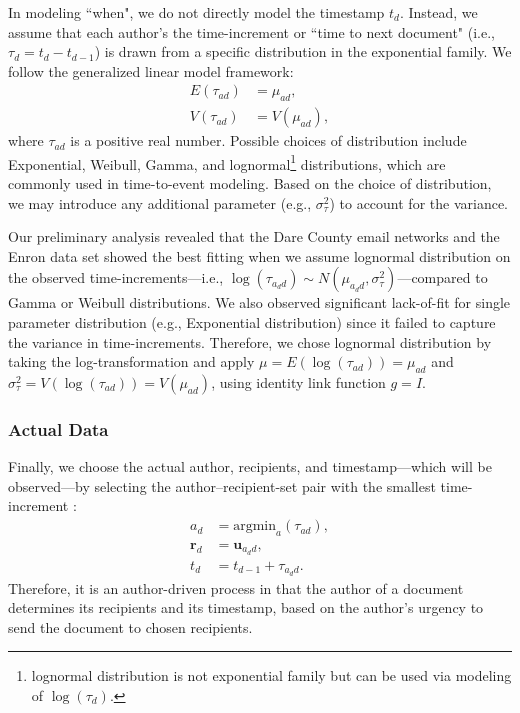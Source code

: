 \documentclass{article}
\begin{document}
In modeling ``when", we do not directly model the timestamp $t_d$. Instead, we assume that each author's the time-increment or ``time to next document" (i.e., $\tau_{d} = t_d-t_{d-1}$) is drawn from a specific distribution in the exponential family.  We follow the generalized linear model framework:
\begin{equation}
\begin{aligned}
E(\tau_{ad}) &= \mu_{ad},\\
V(\tau_{ad}) &= V(\mu_{ad}),
\end{aligned}
\end{equation}
where $\tau_{ad}$ is a positive real number. Possible choices of distribution include Exponential, Weibull, Gamma, and lognormal\footnote{lognormal distribution is not exponential family but can be used via modeling of $\log(\tau_d)$.} distributions, which are commonly used in time-to-event modeling. Based on the choice of distribution, we may introduce any additional parameter (e.g., $\sigma_\tau^2$) to account for the variance.

Our preliminary analysis revealed that the Dare County email networks and the Enron data set showed the best fitting when we assume lognormal distribution on the observed time-increments---i.e., $\log(\tau_{a_dd}) \sim N(\mu_{a_d d}, \sigma^2_\tau)$---compared to Gamma or Weibull distributions. We also observed significant lack-of-fit for single parameter distribution (e.g., Exponential distribution) since it failed to capture the variance in time-increments. Therefore, we chose lognormal distribution by taking the log-transformation and apply $\mu = E(\log(\tau_{ad})) = \mu_{ad}$ and $ \sigma_\tau^2=V(\log(\tau_{ad})) = V(\mu_{ad})$, using identity link function $g = I$. 



\subsubsection{Actual Data}\label{subsubsec:Actual Data}
Finally, we choose the actual author, recipients, and timestamp---which will be observed---by selecting the author--recipient-set pair with the smallest time-increment \cite{snijders1996stochastic}:
\begin{equation}
\begin{aligned}
a_d &= \mbox{argmin}_{a}(\tau_{ad}),\\
\boldsymbol{r}_d &= \boldsymbol{u}_{a_d d},\\
t_d &=t_{d-1} + \tau_{a_d d}.
\end{aligned}
\end{equation}
Therefore, it is an author-driven process in that the author of a document determines its recipients and its timestamp, based on the author's urgency to send the document to chosen recipients. 
\end{document}
